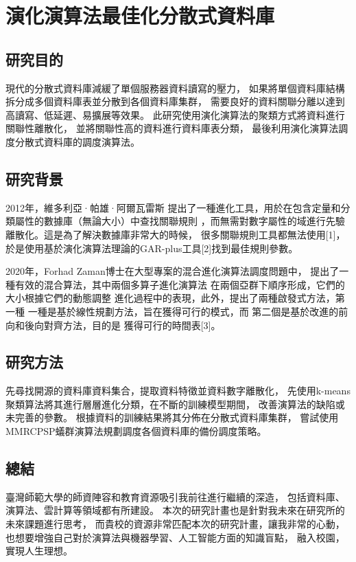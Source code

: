 \documentclass[classical]{einfart}
\begin{document}
\section{演化演算法最佳化分散式資料庫}

\subsection{研究目的}

現代的分散式資料庫減緩了單個服務器資料讀寫的壓力，
如果將單個資料庫結構拆分成多個資料庫表並分散到各個資料庫集群，
需要良好的資料關聯分離以達到高讀寫、低延遲、易擴展等效果。
此研究使用演化演算法的聚類方式將資料進行關聯性離散化，
並將關聯性高的資料進行資料庫表分類，
最後利用演化演算法調度分散式資料庫的調度演算法。

\subsection{研究背景}

2012年，維多利亞·帕雄·阿爾瓦雷斯
提出了一種進化工具，用於在包含定量和分類屬性的數據庫（無論大小）中查找關聯規則
，而無需對數字屬性的域進行先驗離散化。這是為了解決數據庫非常大的時候，
很多關聯規則工具都無法使用[1]，於是使用基於演化演算法理論的GAR-plus工具[2]找到最佳規則參數。

2020年，Forhad Zaman博士在大型專案的混合進化演算法調度問題中，
提出了一種有效的混合算法，其中兩個多算子進化演算法
在兩個亞群下順序形成，它們的大小根據它們的動態調整
進化過程中的表現，此外，提出了兩種啟發式方法，第一種
一種是基於線性規劃方法，旨在獲得可行的模式，而
第二個是基於改進的前向和後向對齊方法，目的是
獲得可行的時間表[3]。

\subsection{研究方法}

先尋找開源的資料庫資料集合，提取資料特徵並資料數字離散化，
先使用k-means聚類算法將其進行層層進化分類，在不斷的訓練模型期間，
改善演算法的缺陷或未完善的參數。
根據資料的訓練結果將其分佈在分散式資料庫集群，
嘗試使用MMRCPSP蟻群演算法規劃調度各個資料庫的備份調度策略。

\subsection{總結}

臺灣師範大學的師資陣容和教育資源吸引我前往進行繼續的深造，
包括資料庫、演算法、雲計算等領域都有所建設。
本次的研究計畫也是針對我未來在研究所的未來課題進行思考，
而貴校的資源非常匹配本次的研究計畫，讓我非常的心動，
也想要增強自己對於演算法與機器學習、人工智能方面的知識盲點，
融入校園，實現人生理想。
\end{document}
